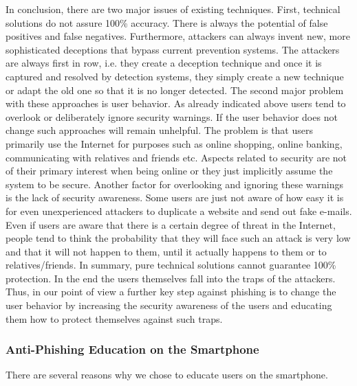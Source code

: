 In conclusion, there are two major issues of existing techniques.
 First, technical solutions do not assure 100\% accuracy.
 There is always the potential of false positives and false negatives.
 Furthermore, attackers can always invent new, more sophisticated deceptions that bypass current prevention systems.
 The attackers are always first in row, i.e.
 they create a deception technique and once it is captured and resolved by detection systems, they simply create a new technique or adapt the old one so that it is no longer detected.
 The second major problem with these approaches is user behavior.
 As already indicated above users tend to overlook or deliberately ignore security warnings.
 If the user behavior does not change such approaches will remain unhelpful.
 The problem is that users primarily use the Internet for purposes such as online shopping, online banking, communicating with relatives and friends etc.
 Aspects related to security are not of their primary interest when being online or they just implicitly assume the system to be secure.
 Another factor for overlooking and ignoring these warnings is the lack of security awareness.
 Some users are just not aware of how easy it is for even unexperienced attackers to duplicate a website and send out fake e-mails.
 Even if users are aware that there is a certain degree of threat in the Internet, people tend to think the probability that they will face such an attack is very low and that it will not happen to them, until it actually happens to them or to relatives/friends.
 In summary, pure technical solutions cannot guarantee 100\% protection.
 In the end the users themselves fall into the traps of the attackers.
 Thus, in our point of view a further key step against phishing is to change the user behavior by increasing the security awareness of the users and educating them how to protect themselves against such traps.

\subsubsection{Anti-Phishing Education on the Smartphone}
\label{s:antiphishing_on_smartphone}
There are several reasons why we chose to educate users on the smartphone.

